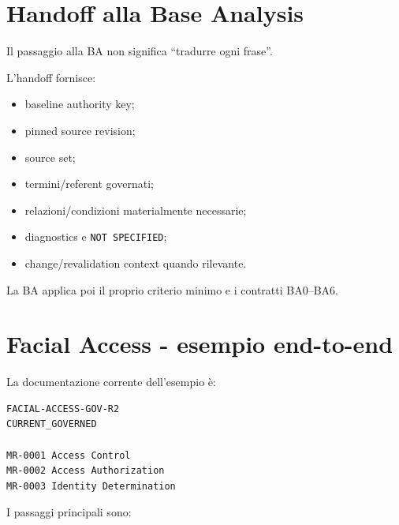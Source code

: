 \documentclass[11pt,a4paper]{article}
\newcommand{\code}[1]{\nolinkurl{#1}}
\begin{document}
\section{Handoff alla Base Analysis}

Il passaggio alla BA non significa ``tradurre ogni frase''.

L'handoff fornisce:

\begin{itemize}
\item baseline authority key;
\item pinned source revision;
\item source set;
\item termini/referent governati;
\item relazioni/condizioni materialmente necessarie;
\item diagnostics e \code{NOT SPECIFIED};
\item change/revalidation context quando rilevante.
\end{itemize}

La BA applica poi il proprio criterio minimo e i contratti BA0--BA6.

\section{Facial Access - esempio end-to-end}

La documentazione corrente dell'esempio è:

\begin{lstlisting}
FACIAL-ACCESS-GOV-R2
CURRENT_GOVERNED

MR-0001 Access Control
MR-0002 Access Authorization
MR-0003 Identity Determination
\end{lstlisting}

I passaggi principali sono:
\end{document}
